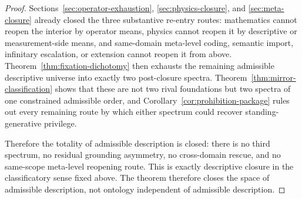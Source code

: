 \begin{proof}
Sections~\ref{sec:operator-exhaustion}, \ref{sec:physics-closure}, and \ref{sec:meta-closure} already closed the three substantive re-entry routes: mathematics cannot reopen the interior by operator means, physics cannot reopen it by descriptive or measurement-side means, and same-domain meta-level coding, semantic import, infinitary escalation, or extension cannot reopen it from above. Theorem~\ref{thm:fixation-dichotomy} then exhausts the remaining admissible descriptive universe into exactly two post-closure spectra. Theorem~\ref{thm:mirror-classification} shows that these are not two rival foundations but two spectra of one constrained admissible order, and Corollary~\ref{cor:prohibition-package} rules out every remaining route by which either spectrum could recover standing-generative privilege.

Therefore the totality of admissible description is closed: there is no third spectrum, no residual grounding asymmetry, no cross-domain rescue, and no same-scope meta-level reopening route. This is exactly descriptive closure in the classificatory sense fixed above. The theorem therefore closes the space of admissible description, not ontology independent of admissible description.
\end{proof}

